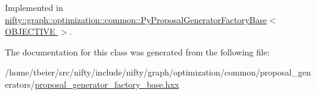Implemented in \hyperlink{classnifty_1_1graph_1_1optimization_1_1common_1_1PyProposalGeneratorFactoryBase_a7a63d91299707117bd6c1d8d69fbafeb}{nifty\+::graph\+::optimization\+::common\+::\+Py\+Proposal\+Generator\+Factory\+Base$<$ O\+B\+J\+E\+C\+T\+I\+V\+E $>$}.



The documentation for this class was generated from the following file\+:\begin{DoxyCompactItemize}
\item 
/home/tbeier/src/nifty/include/nifty/graph/optimization/common/proposal\+\_\+generators/\hyperlink{common_2proposal__generators_2proposal__generator__factory__base_8hxx}{proposal\+\_\+generator\+\_\+factory\+\_\+base.\+hxx}\end{DoxyCompactItemize}

